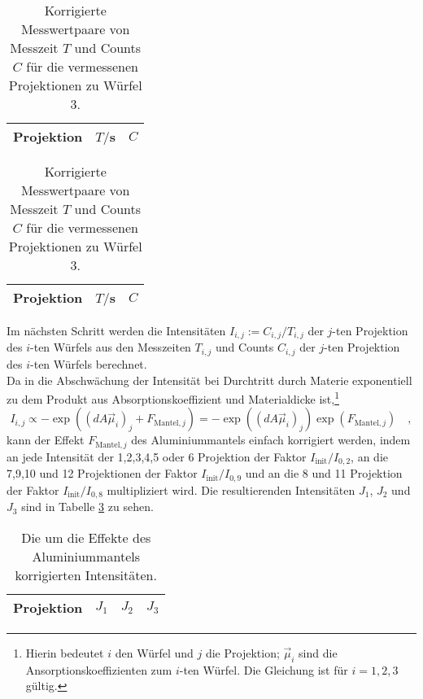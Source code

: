 \begin{table}
\centering
\begin{tabular}{ccc}
\toprule
\midrule
Projektion &$T/$s & $C$ \\
\midrule

\midrule
\bottomrule
\end{tabular}
\caption{Korrigierte Messwertpaare von Messzeit $T$ und Counts $C$ für die vermessenen 
Projektionen zu 
Würfel 2.} \label{tab:2}

\begin{tabular}{ccc}
\toprule
\midrule
Projektion &$T/$s & $C$ \\
\midrule

\midrule
\bottomrule
\end{tabular}
\caption{Korrigierte Messwertpaare von Messzeit $T$ und Counts $C$ für die vermessenen 
Projektionen zu 
Würfel 3.} \label{tab:3}
\end{table}
\clearpage
Im nächsten Schritt werden die Intensitäten $I_{i,j}:=C_{i,j}/T_{i,j}$ der $j$-ten Projektion des 
$i$-ten 
Würfels aus den Messzeiten $T_{i,j}$ und Counts $C_{i,j}$ der $j$-ten Projektion des 
$i$-ten Würfels berechnet.\\
Da in die Abschwächung der Intensität bei Durchtritt durch Materie exponentiell zu dem Produkt 
aus Absorptionskoeffizient und Materialdicke ist,\footnote{Hierin bedeutet $i$ den Würfel und 
$j$ die Projektion; $\vec{\mu}_i$ sind die Ansorptionskoeffizienten zum $i$-ten Würfel. Die 
Gleichung ist für $i=1,2,3$ gültig.}
\begin{equation}
I_{i,j} \propto -\exp\left( (d A \vec{\mu}_i)_{j} + F_{\text{Mantel},j} \right)=
-\exp\left( (d A \vec{\mu}_i)_j \right) \exp\left( F_{\text{Mantel},j} \right) \quad ,
\end{equation} 
kann der Effekt $F_{\text{Mantel},j}$ des Aluminiummantels einfach 
korrigiert werden, indem an jede Intensität der 1,2,3,4,5 oder 6 Projektion der Faktor 
$I_\text{init}/I_{0,2}$, an die 7,9,10 und 12 Projektionen der Faktor $I_\text{init}/I_{0,9}$ und 
an die 8 und 11 Projektion der Faktor $I_\text{init}/I_{0,8}$ multipliziert wird. Die 
resultierenden Intensitäten $J_1$, $J_2$ und $J_3$ sind in Tabelle \ref{tab:korr} zu sehen.
\begin{table}[h]
\centering
\begin{tabular}{cccc}
\toprule
\midrule
Projektion &	$J_1$ & $J_2$ & $J_3$ \\
\midrule

\midrule
\bottomrule
\end{tabular}
\caption{Die um die Effekte des Aluminiummantels korrigierten Intensitäten.} \label{tab:korr}
\end{table}
\clearpage

